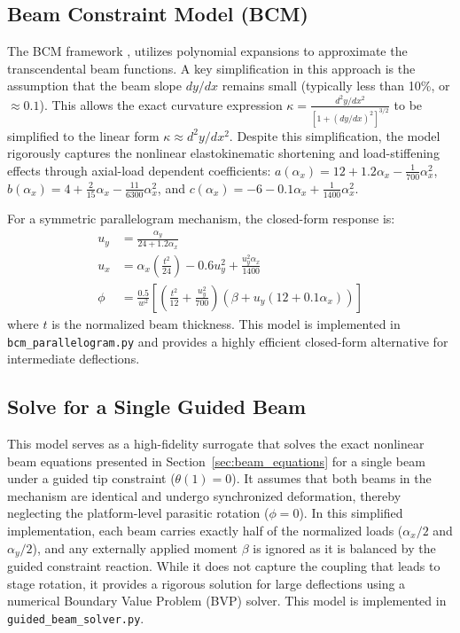 \documentclass[colorlinks,upint,subscriptcorrection,varvw,hyphenate,balance]{asmeconf} %
\begin{document}
\subsection{Beam Constraint Model (BCM)}
\label{sec:bcm}
The BCM framework \cite{awtar2007characteristics}, utilizes polynomial expansions to approximate the transcendental beam functions. A key simplification in this approach is the assumption that the beam slope $dy/dx$ remains small (typically less than 10\%, or $\approx 0.1$). This allows the exact curvature expression $\kappa = \frac{d^2y/dx^2}{[1 + (dy/dx)^2]^{3/2}}$ to be simplified to the linear form $\kappa \approx d^2y/dx^2$. Despite this simplification, the model rigorously captures the nonlinear elastokinematic shortening and load-stiffening effects through axial-load dependent coefficients: $a(\alpha_x) = 12 + 1.2 \alpha_x - \frac{1}{700} \alpha_x^2$, $b(\alpha_x) = 4 + \frac{2}{15} \alpha_x - \frac{11}{6300} \alpha_x^2$, and $c(\alpha_x) = -6 - 0.1 \alpha_x + \frac{1}{1400} \alpha_x^2$.

For a symmetric parallelogram mechanism, the closed-form response is:
\begin{align}
u_y &= \frac{\alpha_y}{24 + 1.2 \alpha_x} \label{eq:bcm_uy} \\
u_x &= \alpha_x \left( \frac{t^2}{24} \right) - 0.6 u_y^2 + \frac{u_y^2 \alpha_x}{1400} \label{eq:bcm_ux} \\
\phi &= \frac{0.5}{w^2} \left[ \left( \frac{t^2}{12} + \frac{u_y^2}{700} \right) \left( \beta + u_y (12 + 0.1 \alpha_x) \right) \right] \label{eq:bcm_phi}
\end{align}
where $t$ is the normalized beam thickness. This model is implemented in \texttt{bcm\_parallelogram.py} and provides a highly efficient closed-form alternative for intermediate deflections.

\subsection{Solve for a Single Guided Beam}
\label{sec:guided}
This model serves as a high-fidelity surrogate that solves the exact nonlinear beam equations presented in Section~\ref{sec:beam_equations} for a single beam under a guided tip constraint ($\theta(1)=0$). It assumes that both beams in the mechanism are identical and undergo synchronized deformation, thereby neglecting the platform-level parasitic rotation ($\phi = 0$). In this simplified implementation, each beam carries exactly half of the normalized loads ($\alpha_x/2$ and $\alpha_y/2$), and any externally applied moment $\beta$ is ignored as it is balanced by the guided constraint reaction. While it does not capture the coupling that leads to stage rotation, it provides a rigorous solution for large deflections using a numerical Boundary Value Problem (BVP) solver. This model is implemented in \texttt{guided\_beam\_solver.py}.
\end{document}
